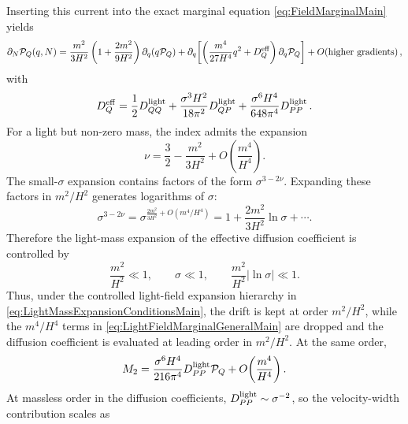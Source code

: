 \documentclass{article}
\numberwithin{equation}{section}
\begin{document}
	Inserting this current into the exact marginal equation \cref{eq:FieldMarginalMain} yields
	\begin{align}
		\partial_N{\cal P}_Q(q,N)
		=
		\frac{m^2}{3H^2}
		\left(
		1+\frac{2m^2}{9H^2}
		\right)
		\partial_q\!\left(q{\cal P}_Q\right)
		+
		\partial_q\!\left[
		\left(
		\frac{m^4}{27H^4}q^2
		+
		D_Q^{\rm eff}
		\right)
		\partial_q{\cal P}_Q
		\right]
		+
		O\!\left(\text{higher gradients}\right),
		\label{eq:LightFieldMarginalGeneralMain}
	\end{align}
	with
	\begin{equation}
		D_Q^{\rm eff}
		=
		\frac12D_{QQ}^{\rm light}
		+
		\frac{\sigma^3H^2}{18\pi^2}D_{QP}^{\rm light}
		+
		\frac{\sigma^6H^4}{648\pi^4}D_{PP}^{\rm light}\, .
		\label{eq:DQEffectiveLightMain}
	\end{equation}
	For a light but non-zero mass, the index admits the expansion
    \begin{equation}
    \nu=\frac32-\frac{m^2}{3H^2}+O\!\left(\frac{m^4}{H^4}\right).
    \label{eq:LightNuExpansionMain}
    \end{equation}
    The small-\(\sigma\) expansion contains factors of the form \(\sigma^{3-2\nu}\). Expanding these factors in \(m^2/H^2\) generates logarithms of \(\sigma\):
    \begin{equation}
    \sigma^{3-2\nu}=\sigma^{\frac{2m^2}{3H^2}+O(m^4/H^4)}=1+\frac{2m^2}{3H^2}\ln\sigma+\cdots .
    \label{eq:LightSigmaNonUniformMain}
    \end{equation}
    Therefore the light-mass expansion of the effective diffusion coefficient is controlled by
	\begin{equation}
		\frac{m^2}{H^2}\ll1,
		\qquad
		\sigma\ll1,
		\qquad
		\frac{m^2}{H^2}|\ln\sigma|\ll1.
		\label{eq:LightMassExpansionConditionsMain}
	\end{equation}
	Thus, under the controlled light-field expansion hierarchy in \cref{eq:LightMassExpansionConditionsMain}, the drift is kept at order \(m^2/H^2\), while the \(m^4/H^4\) terms in \cref{eq:LightFieldMarginalGeneralMain} are dropped and the diffusion coefficient is evaluated at leading order in \(m^2/H^2\). At the same order,
	\begin{equation}
		M_2
		=
		\frac{\sigma^6H^4}{216\pi^4}D_{PP}^{\rm light}{\cal P}_Q
		+
		O\!\left(\frac{m^4}{H^4}\right).
		\label{eq:ProjectedSecondVelocityMomentLeadingMain}
	\end{equation}
	At massless order in the diffusion coefficients, \(D_{PP}^{\rm light}\sim\sigma^{-2}\), so the velocity-width contribution scales as
\end{document}
